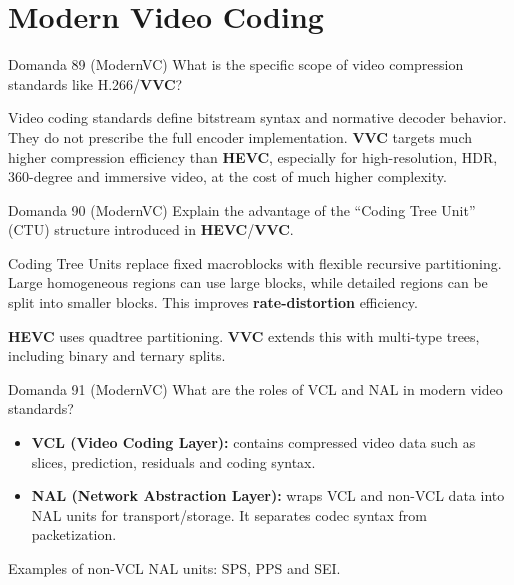 \section{Modern Video Coding}




\begin{questionbox}{Domanda 89}
(ModernVC) What is the specific scope of video compression standards like H.266/\textbf{VVC}?
\end{questionbox}


Video coding standards define bitstream syntax and normative decoder behavior. They do not prescribe the full encoder implementation. \textbf{VVC} targets much higher compression efficiency than \textbf{HEVC}, especially for high-resolution, HDR, 360-degree and immersive video, at the cost of much higher complexity.



\begin{questionbox}{Domanda 90}
(ModernVC) Explain the advantage of the “Coding Tree Unit” (CTU) structure introduced in \textbf{HEVC}/\textbf{VVC}.
\end{questionbox}


Coding Tree Units replace fixed macroblocks with flexible recursive partitioning. Large homogeneous regions can use large blocks, while detailed regions can be split into smaller blocks. This improves \textbf{\textbf{rate}-\textbf{distortion}} efficiency.

\textbf{HEVC} uses quadtree partitioning. \textbf{VVC} extends this with multi-type trees, including binary and ternary splits.



\begin{questionbox}{Domanda 91}
(ModernVC) What are the roles of VCL and NAL in modern video standards?
\end{questionbox}


\begin{itemize}
  \item \textbf{VCL (Video Coding Layer):} contains compressed video data such as slices, prediction, residuals and coding syntax.
  \item \textbf{NAL (Network Abstraction Layer):} wraps VCL and non-VCL data into NAL units for transport/storage. It separates codec syntax from packetization.
\end{itemize}

Examples of non-VCL NAL units: SPS, PPS and SEI.




